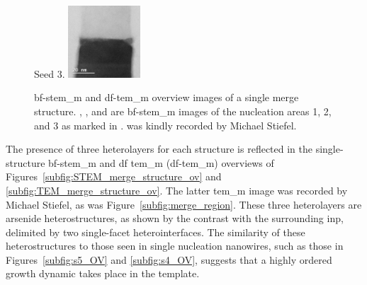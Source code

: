\begin{figure}
{        Seed 3.
        \label{subfig:STEM_merge_seed3}
    }{
        \includegraphics[width=0.24\textwidth]{4_Properties/Fig/STEM_merge_seed3.pdf}
    }
    \caption[\acs{tem_m} and \acs{stem_m} images of the merge structures of sample 5.]{ \acs{bf}-\acs{stem_m} and  \acs{df}-\acs{tem_m} overview images of a single merge structure. , , and  are \acs{bf}-\acs{stem_m} images of the nucleation areas 1, 2, and 3 as marked in .  was kindly recorded by Michael Stiefel.}
    \label{fig:merge_ov_seeds}
\end{figure}

The presence of three heterolayers for each structure is reflected in the single-structure \acs{bf}-\acs{stem_m} and \acl{df} \acl{tem_m} (\acs{df}-\acs{tem_m}) overviews of Figures~\ref{subfig:STEM_merge_structure_ov} and \ref{subfig:TEM_merge_structure_ov}. The latter \acs{tem_m} image was recorded by Michael Stiefel, as was Figure~\ref{subfig:merge_region}. These three heterolayers are arsenide heterostructures, as shown by the contrast with the surrounding \acs{inp}, delimited by two single-facet  heterointerfaces. The similarity of these heterostructures to those seen in single nucleation nanowires, such as those in Figures~\ref{subfig:s5_OV} and \ref{subfig:s4_OV}, suggests that a highly ordered growth dynamic takes place in the template.

